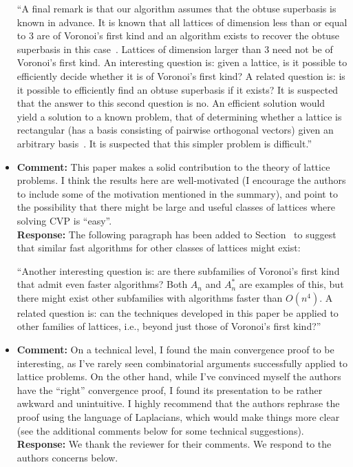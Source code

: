 \documentclass[a4paper,10pt]{article}
\begin{document}
\begin{itemize}
``A final remark is that our algorithm assumes that the obtuse superbasis is known in advance.  It is known that all lattices of dimension less than or equal to 3 are of Voronoi's first kind and an algorithm exists to recover the obtuse superbasis in this case~\cite{SPLAG}.  Lattices of dimension larger than 3 need not be of Voronoi's first kind.  An interesting question is: given a lattice, is it possible to efficiently decide whether it is of Voronoi's first kind?  A related question is: is it possible to efficiently find an obtuse superbasis if it exists?  It is suspected that the answer to this second question is no.  An efficient solution would yield a solution to a known problem, that of determining whether a lattice is rectangular (has a basis consisting of pairwise orthogonal vectors) given an arbitrary basis~\cite{Lenstra_Silverberg_revisting_gentra_szydlo_2014}.  It is suspected that this simpler problem is difficult.''


\item\textbf{Comment:} 
This paper makes a solid contribution to the theory of lattice problems. I think the results here are
well-motivated (I encourage the authors to include some of the motivation mentioned in the summary), and point to the possibility that there might be large and useful classes of lattices where
solving CVP is “easy”.
\\\textbf{Response:}
The following paragraph has been added to Section~ to suggest that similar fast algorithms for other classes of lattices might exist:

``Another interesting question is: are there subfamilies of Voronoi's first kind that admit even faster algorithms?  Both $A_n$ and $A_n^*$ are examples of this, but there might exist other subfamilies with algorithms faster than $O(n^4)$.  A related question is: can the techniques developed in this paper be applied to other families of lattices, i.e., beyond just those of Voronoi's first kind?''


\item\textbf{Comment:} 
On a technical level, I found the main convergence proof to be interesting, as I've rarely seen
combinatorial arguments successfully applied to lattice problems. On the other hand, while I've
convinced myself the authors have the ``right'' convergence proof, I found its presentation to be
rather awkward and unintuitive. I highly recommend that the authors rephrase the proof using
the language of Laplacians, which would make things more clear (see the additional comments
below for some technical suggestions).
\\\textbf{Response:}
We thank the reviewer for their comments.  We respond to the authors concerns below.

\end{itemize}
\end{document}
